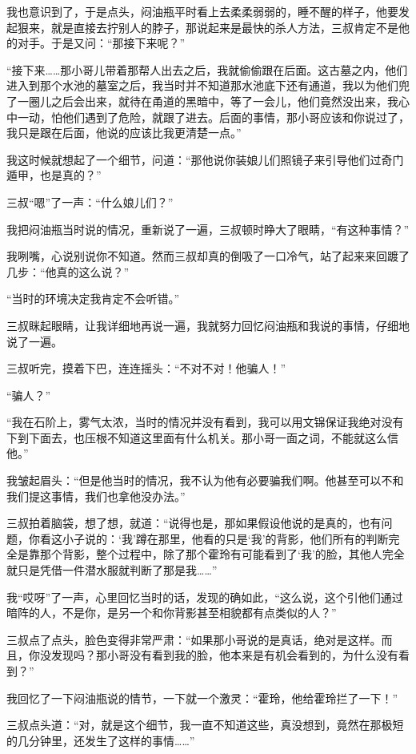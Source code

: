 我也意识到了，于是点头，闷油瓶平时看上去柔柔弱弱的，睡不醒的样子，他要发起狠来，就是直接去拧别人的脖子，那说起来是最快的杀人方法，三叔肯定不是他的对手。于是又问：“那接下来呢？”

“接下来……那小哥儿带着那帮人出去之后，我就偷偷跟在后面。这古墓之内，他们进入到那个水池的墓室之后，我当时并不知道那水池底下还有通道，我以为他们兜了一圈儿之后会出来，就待在甬道的黑暗中，等了一会儿，他们竟然没出来，我心中一动，怕他们遇到了危险，就跟了进去。后面的事情，那小哥应该和你说过了，我只是跟在后面，他说的应该比我更清楚一点。”

我这时候就想起了一个细节，问道：“那他说你装娘儿们照镜子来引导他们过奇门遁甲，也是真的？”

三叔“嗯”了一声：“什么娘儿们？”

我把闷油瓶当时说的情况，重新说了一遍，三叔顿时睁大了眼睛，“有这种事情？”

我咧嘴，心说别说你不知道。然而三叔却真的倒吸了一口冷气，站了起来来回踱了几步：“他真的这么说？”

“当时的环境决定我肯定不会听错。”

三叔眯起眼睛，让我详细地再说一遍，我就努力回忆闷油瓶和我说的事情，仔细地说了一遍。

三叔听完，摸着下巴，连连摇头：“不对不对！他骗人！”

“骗人？”

“我在石阶上，雾气太浓，当时的情况并没有看到，我可以用文锦保证我绝对没有下到下面去，也压根不知道这里面有什么机关。那小哥一面之词，不能就这么信他。”

我皱起眉头：“但是他当时的情况，我不认为他有必要骗我们啊。他甚至可以不和我们提这事情，我们也拿他没办法。”

三叔拍着脑袋，想了想，就道：“说得也是，那如果假设他说的是真的，也有问题，你看这小子说的：‘我’蹲在那里，他看的只是‘我’的背影，他们所有的判断完全是靠那个背影，整个过程中，除了那个霍玲有可能看到了‘我’的脸，其他人完全就只是凭借一件潜水服就判断了那是我……”

我“哎呀”了一声，心里回忆当时的话，发现的确如此，“这么说，这个引他们通过暗阵的人，不是你，是另一个和你背影甚至相貌都有点类似的人？”

三叔点了点头，脸色变得非常严肃：“如果那小哥说的是真话，绝对是这样。而且，你没发现吗？那小哥没有看到我的脸，他本来是有机会看到的，为什么没有看到？”

我回忆了一下闷油瓶说的情节，一下就一个激灵：“霍玲，他给霍玲拦了一下！”

三叔点头道：“对，就是这个细节，我一直不知道这些，真没想到，竟然在那极短的几分钟里，还发生了这样的事情……”


